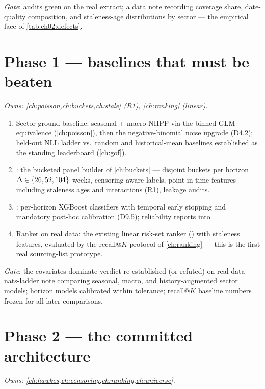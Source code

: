 \emph{Gate}: audits green on the real extract; a data note recording
coverage share, date-quality composition, and staleness-age
distributions by sector --- the empirical face of
\cref{tab:ch02:defects}.

\section{Phase 1 --- baselines that must be beaten}\label{ch13:sec:phase1}

\emph{Owns: \cref{ch:poisson,ch:buckets,ch:stale} (R1),
\cref{ch:ranking} (linear).}

\begin{enumerate}[label=P1.\arabic*,leftmargin=3.2em]
\item Sector ground baseline: seasonal + macro NHPP via the binned GLM
equivalence (\cref{ch:poisson}), then the negative-binomial noise
upgrade (D4.2); held-out NLL ladder vs.\ random and historical-mean
baselines established as the standing leaderboard (\cref{ch:gof}).
\item {}: the bucketed panel builder of \cref{ch:buckets}
--- disjoint buckets per horizon $\Delta \in \{26, 52, 104\}$ weeks,
censoring-aware labels, point-in-time features including staleness ages
and interactions (R1), leakage audits.
\item {}: per-horizon XGBoost classifiers
with temporal early stopping and mandatory post-hoc calibration
(D9.5); reliability reports into .
\item Ranker on real data: the existing linear risk-set ranker
() with staleness features, evaluated by the
recall@$K$ protocol of \cref{ch:ranking} --- this is the first real
sourcing-list prototype.
\end{enumerate}

\emph{Gate}: the covariates-dominate verdict re-established (or
refuted) on real data --- nats-ladder note comparing seasonal, macro,
and history-augmented sector models; horizon models calibrated within
tolerance; recall@$K$ baseline numbers frozen for all later
comparisons.

\section{Phase 2 --- the committed architecture}\label{ch13:sec:phase2}

\emph{Owns: \cref{ch:hawkes,ch:censoring,ch:ranking,ch:universe}.}

